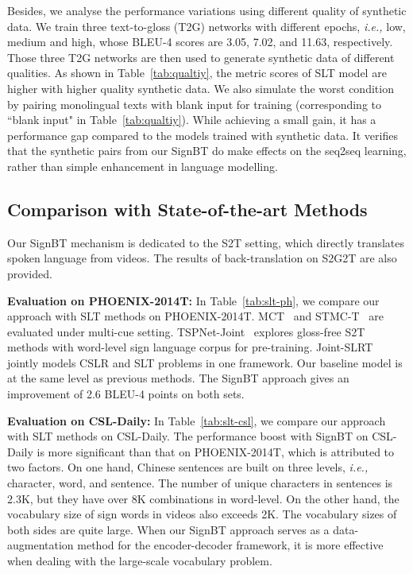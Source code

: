 \documentclass[final]{cvpr}
\begin{document}
Besides, we analyse the performance variations using different quality of synthetic data. 
We train three text-to-gloss (T2G) networks with different epochs, \emph{i.e.,} low, medium and high, whose BLEU-4 scores are 3.05, 7.02, and 11.63, respectively. 
Those three T2G networks are then used to generate synthetic data of different qualities. 
As shown in Table~\ref{tab:qualtiy}, the metric scores of SLT model are higher with higher quality synthetic data.
We also simulate the worst condition by pairing monolingual texts with blank input for training (corresponding to ``blank input" in Table~\ref{tab:qualtiy}). 
While achieving a small gain, it has a performance gap compared to the models trained with synthetic data. 
It verifies that the synthetic pairs from our SignBT do make effects on the seq2seq learning, rather than simple enhancement in language modelling. 


\subsection{Comparison with State-of-the-art Methods}
Our SignBT mechanism is dedicated to the S2T setting, which directly translates spoken language from videos. 
The results of back-translation on S2G2T are also provided. 

\textbf{Evaluation on PHOENIX-2014T:}
In Table~\ref{tab:slt-ph}, we compare our approach with SLT methods on PHOENIX-2014T. 
MCT~\cite{slt-camgoz2020multi} and STMC-T~\cite{stmc-tmm} are evaluated under multi-cue setting. 
TSPNet-Joint~\cite{tspnet-nips20} explores gloss-free S2T methods with word-level sign language corpus for pre-training. 
Joint-SLRT~\cite{slt-trans-cihan20} jointly models CSLR and SLT problems in one framework.
Our baseline model is at the same level as previous methods. 
The SignBT approach gives an improvement of 2.6 BLEU-4 points on both sets.  

\textbf{Evaluation on CSL-Daily:}
In Table~\ref{tab:slt-csl}, we compare our approach with SLT methods on CSL-Daily. 
The performance boost with SignBT on CSL-Daily is more significant than that on PHOENIX-2014T, which is attributed to two factors. 
On one hand, Chinese sentences are built on three levels, \emph{i.e.,} character, word, and sentence.  
The number of unique characters in sentences is 2.3K, but they have over 8K combinations in word-level. 
On the other hand, the vocabulary size of sign words in videos also exceeds 2K. 
The vocabulary sizes of both sides are quite large. 
When our SignBT approach serves as a data-augmentation method for the encoder-decoder framework,
it is more effective when dealing with the large-scale vocabulary problem.  
\end{document}
